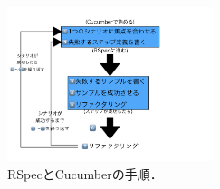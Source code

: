 \begin{figure}[htbp]\begin{center}
\includegraphics[width=6cm,bb=0 0 442 500]{../figs/./my_help_nasu1.001.jpg}
\caption{RSpecとCucumberの手順．}
\label{default}\end{center}\end{figure}
